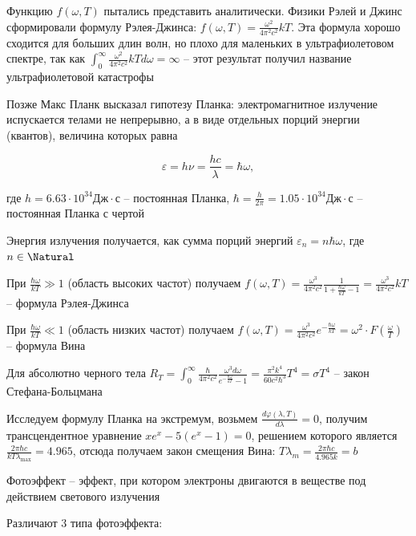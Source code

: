 Функцию $f(\omega, T)$ пытались представить аналитически. Физики Рэлей и Джинс сформировали формулу Рэлея-Джинса: $f(\omega, T) = \frac{\omega^2}{4\pi^2 c^2} kT$. Эта формула хорошо сходится для больших длин волн, но плохо для маленьких в ультрафиолетовом спектре, так как $\int_0^\infty \frac{\omega^2}{4\pi^2 c^2} kT d\omega = \infty$ -- этот результат получил название ультрафиолетовой катастрофы

Позже Макс Планк высказал гипотезу Планка: электромагнитное излучение испускается телами не непрерывно, а в виде отдельных порций энергии (квантов), величина которых равна 

\[\varepsilon = h \nu = \frac{h c}{\lambda} = \hbar \omega,\]

где $h = 6.63 \cdot 10^{34} \text{Дж}\cdot\text{с}$ -- постоянная Планка, $\hbar = \frac{h}{2\pi} = 1.05 \cdot 10^{34} \text{Дж}\cdot\text{с}$ -- постоянная Планка с чертой

Энергия излучения получается, как сумма порций энергий $\varepsilon_n = n \hbar \omega$, где $n \in \Natural$

При $\frac{\hbar \omega}{kT} \gg 1$ (область высоких частот) получаем $f(\omega, T) = \frac{\omega^3}{4\pi^2 c^2} \frac{1}{1 + \frac{\hbar \omega}{kT} - 1} = \frac{\omega^3}{4\pi^2 c^2} kT$ -- формула Рэлея-Джинса

При $\frac{\hbar \omega}{kT} \ll 1$ (область низких частот) получаем $f(\omega, T) = \frac{\omega^3}{4\pi^2 c^2} e^{-\frac{\hbar \omega}{k T}} = \omega^2 \cdot F\left(\frac{\omega}{T}\right)$ -- формула Вина

Для абсолютно черного тела $R_T = \int_0^\infty \frac{\hbar}{4\pi^2 c^2} \frac{\omega^3 d\omega}{e^{-\frac{\hbar \omega}{k T}} - 1} = \frac{\pi^2 k^4}{60 c^2 \hbar^3} T^4 = \sigma T^4$ -- закон Стефана-Больцмана

\smallvspace 

Исследуем формулу Планка на экстремум, возьмем $\frac{d \varphi(\lambda, T)}{d\lambda} = 0$, получим трансцендентное уравнение $x e^x - 5(e^x - 1) = 0$, решением которого является $\frac{2\pi \hbar c}{k T \lambda_{\max}} = 4.965$, отсюда получаем закон смещения Вина: $T \lambda_m = \frac{2\pi \hbar c}{4.965 k} = b$

\bigvspace

Фотоэффект -- эффект, при котором электроны двигаются в веществе под действием светового излучения

Различают 3 типа фотоэффекта:

